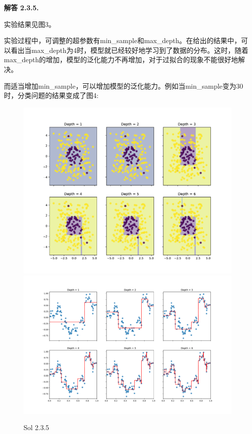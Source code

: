 \documentclass[12pt, a4paper, oneside]{ctexart}
\newenvironment{solution}[1]{\par\noindent\textbf{解答 #1. }\par}{\par}
\begin{document}
\begin{solution}{2.3.5}
    实验结果见图3。\par
    实验过程中，可调整的超参数有min\_sample和max\_depth。在给出的结果中，可以看出当max\_depth为4时，模型就已经较好地学习到了数据的分布。这时，随着max\_depth的增加，模型的泛化能力不再增加，对于过拟合的现象不能很好地解决。\par
    而适当增加min\_sample，可以增加模型的泛化能力。例如当min\_sample变为30时，分类问题的结果变成了图4:
    \begin{figure}[htbp]
        \centering
        \includegraphics[width=.9\textwidth]{pdf/DT_entropy.pdf}
        \includegraphics[width=.9\textwidth]{pdf/DT_regression.pdf}
        \caption{Sol 2.3.5}
    \end{figure}


\end{solution}
\end{document}
